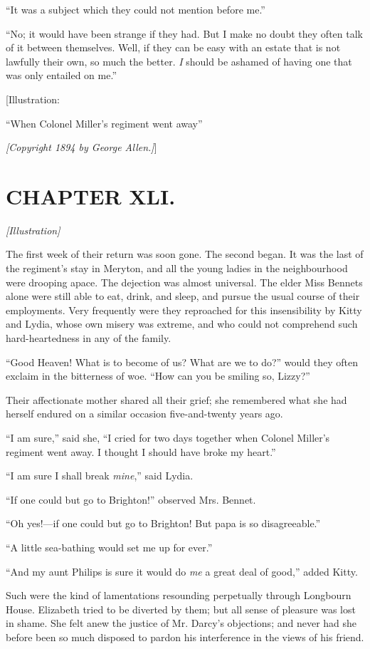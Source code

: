 \documentclass[12pt]{book}
\begin{document}
``It was a subject which they could not mention before me.''

``No; it would have been strange if they had. But I make no doubt they often talk of it between themselves. Well, if they can be easy with an estate that is not lawfully their own, so much the better. \textit{I} should be ashamed of having one that was only entailed on me.''

[Illustration:

``When Colonel Miller's regiment went away''

\emph{[\textit{Copyright 1894 by George Allen.}]}]

\chapter{CHAPTER XLI.}

\emph{[Illustration]}

The first week of their return was soon gone. The second began. It was the last of the regiment's stay in Meryton, and all the young ladies in the neighbourhood were drooping apace. The dejection was almost universal. The elder Miss Bennets alone were still able to eat, drink, and sleep, and pursue the usual course of their employments. Very frequently were they reproached for this insensibility by Kitty and Lydia, whose own misery was extreme, and who could not comprehend such hard-heartedness in any of the family.

``Good Heaven! What is to become of us? What are we to do?'' would they often exclaim in the bitterness of woe. ``How can you be smiling so, Lizzy?''

Their affectionate mother shared all their grief; she remembered what she had herself endured on a similar occasion five-and-twenty years ago.

``I am sure,'' said she, ``I cried for two days together when Colonel Miller's regiment went away. I thought I should have broke my heart.''

``I am sure I shall break \textit{mine},'' said Lydia.

``If one could but go to Brighton!'' observed Mrs. Bennet.

``Oh yes!---if one could but go to Brighton! But papa is so disagreeable.''

``A little sea-bathing would set me up for ever.''

``And my aunt Philips is sure it would do \textit{me} a great deal of good,'' added Kitty.

Such were the kind of lamentations resounding perpetually through Longbourn House. Elizabeth tried to be diverted by them; but all sense of pleasure was lost in shame. She felt anew the justice of Mr. Darcy's objections; and never had she before been so much disposed to pardon his interference in the views of his friend.
\end{document}

